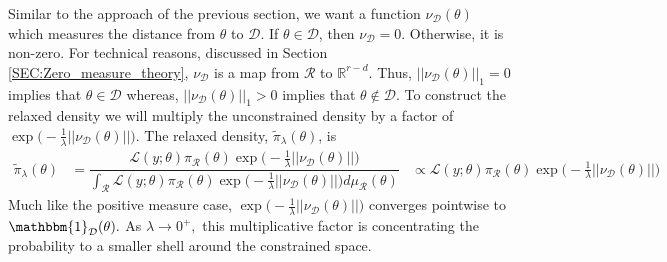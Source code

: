 \documentclass[10pt,fleqn]{article}
\DeclareMathOperator{\1}{\mathbbm{1}}
\begin{document}
{Similar to the approach of the previous section, we want a function $\nu_\mathcal{D}(\theta)$ which measures the distance from $\theta$ to $\mathcal{D}.$ If $\theta\in\mathcal{D}$, then $\nu_\mathcal{D}=0$. Otherwise, it is non-zero.  For technical reasons, discussed in Section \ref{SEC:Zero_measure_theory}, $\nu_\mathcal{D}$ is a map from $\mathcal{R}$ to $\mathbb{R}^{r-d}.$ Thus, $||\nu_\mathcal{D}(\theta)||_1 = 0$ implies that $\theta \in \mathcal{D}$ whereas, $||\nu_\mathcal{D}(\theta)||_1 >0$ implies that $\theta\notin\mathcal{D}.$ To construct the relaxed density we will multiply the unconstrained density by a factor of $\exp\bigg(-\frac{1}{\lambda}||\nu_\mathcal{D}(\theta)||\bigg)$. The relaxed density, $\tilde{\pi}_\lambda(\theta)$, is 
\begin{equation}
\begin{split}
\tilde{\pi}_\lambda(\theta) &= \dfrac{\mathcal{L}(y;\theta) \pi_\mathcal{R}(\theta)\exp\bigg(-\frac{1}{\lambda}||\nu_\mathcal{D}(\theta)||\bigg)}{\int_\mathcal{R} \mathcal{L}(y;\theta) \pi_\mathcal{R}(\theta)\exp\bigg(-\frac{1}{\lambda}||\nu_\mathcal{D}(\theta)||\bigg) d\mu_\mathcal{R}(\theta) }
& \propto \mathcal{L}(y;\theta) \pi_\mathcal{R}(\theta)\exp\bigg(-\frac{1}{\lambda}||\nu_\mathcal{D}(\theta)||\bigg)
\end{split}
\end{equation}
Much like the positive measure case, $\exp\bigg(-\frac{1}{\lambda}||\nu_\mathcal{D}(\theta)||\bigg)$ converges pointwise to $\mathbbm{1}_\mathcal{D}(\theta).$ As $\lambda\to0^+,$ this multiplicative factor is concentrating the probability to a smaller shell around the constrained space.



}
\end{document}
